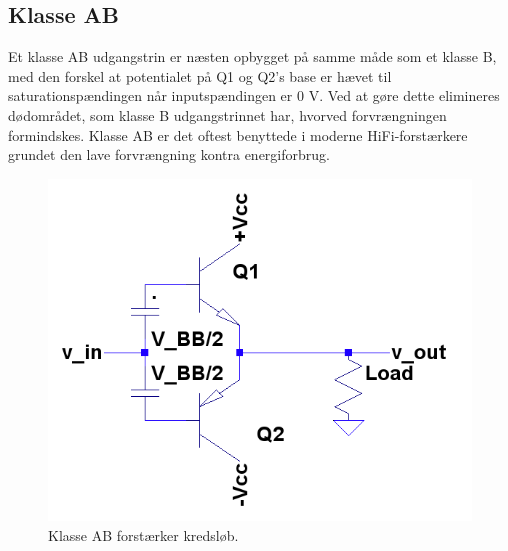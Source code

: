 \subsection{Klasse AB}

Et klasse AB udgangstrin er næsten opbygget på samme måde som et klasse B, med den forskel at potentialet på Q1 og Q2's base er hævet til saturationspændingen når inputspændingen er 0 V. Ved at gøre dette elimineres dødområdet, som klasse B udgangstrinnet har, hvorved forvrængningen formindskes. 
Klasse AB er det oftest benyttede i moderne HiFi-forstærkere grundet den lave forvrængning kontra energiforbrug. 

\begin{figure}[h]
\centering
\includegraphics[scale=.35]{indledende_analyse/klasser/classab.png}
\caption{Klasse AB forstærker kredsløb.}
\label{fig:classab}
\end{figure}

